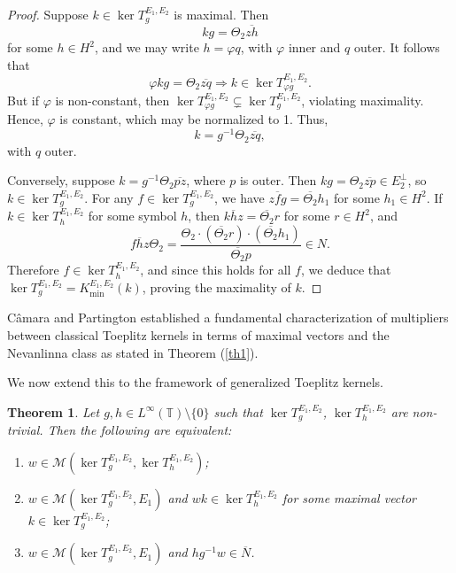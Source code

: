 \documentclass[12pt,a4paper]{amsart}
\newtheorem{theorem}{Theorem}[section]
\begin{document}
\begin{proof}
Suppose \( k \in \ker T_g^{E_1, E_2} \) is maximal. Then
\[
kg = \Theta_2 \overline{zh}
\]
for some \( h \in H^2 \), and we may write \( h = \varphi q \), with \( \varphi \) inner and \( q \) outer. It follows that
\[
\varphi kg = \Theta_2 \overline{zq} \Rightarrow k \in \ker T_{\varphi g}^{E_1, E_2}.
\]
But if \( \varphi \) is non-constant, then \( \ker T_{\varphi g}^{E_1, E_2} \subsetneq \ker T_g^{E_1, E_2} \), violating maximality. Hence, \( \varphi \) is constant, which may be normalized to 1. Thus,
\[
k = g^{-1} \Theta_2 \overline{zq},
\]
with \( q \) outer.

Conversely, suppose \( k = g^{-1} \Theta_2 \overline{pz} \), where \( p \) is outer. Then \( kg = \Theta_2 \overline{zp} \in E_2^\perp \), so \( k \in \ker T_g^{E_1, E_2} \). For any \( f \in \ker T_g^{E_1, E_2} \), we have \( \overline{zfg} = \overline{\Theta_2} h_1 \) for some \( h_1 \in H^2 \). If \( k \in \ker T_h^{E_1, E_2} \) for some symbol \( h \), then \( \overline{khz} = \overline{\Theta_2} r \) for some \( r \in H^2 \), and
\[
\overline{fhz} \Theta_2 = \frac{\Theta_2 \cdot (\overline{\Theta_2} r) \cdot (\overline{\Theta_2} h_1)}{\overline{\Theta_2} p} \in N.
\]
Therefore \( f \in \ker T_h^{E_1, E_2} \), and since this holds for all \( f \), we deduce that \( \ker T_g^{E_1, E_2} = K_{\min}^{E_1, E_2}(k) \), proving the maximality of \( k \).
\end{proof}

C{\^a}mara and Partington \cite{camara2018multipliers} established a fundamental characterization of multipliers between classical Toeplitz kernels in terms of maximal vectors and the Nevanlinna class as stated in Theorem (\ref{th1}).

We now extend this to the framework of generalized Toeplitz kernels.

\begin{theorem}\label{thm10}
Let \( g, h \in L^\infty(\mathbb{T}) \setminus \{0\} \) such that \( \ker T_g^{E_1, E_2} \), \( \ker T_h^{E_1, E_2} \) are non-trivial. Then the following are equivalent:
\begin{enumerate}
    \item \( w \in \mathcal{M}(\ker T_g^{E_1, E_2}, \ker T_h^{E_1, E_2}) \);
    \item \( w \in \mathcal{M}(\ker T_g^{E_1, E_2}, E_1) \) and \( wk \in \ker T_h^{E_1, E_2} \) for some maximal vector \( k \in \ker T_g^{E_1, E_2} \);
    \item \( w \in \mathcal{M}(\ker T_g^{E_1, E_2}, E_1) \) and \( hg^{-1}w \in \overline{N} \).
\end{enumerate}
\end{theorem}
\end{document}
